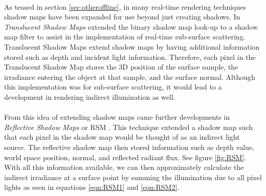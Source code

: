 \paragraph{}
As teased in section \ref{sec:otheroffline}, in many real-time rendering techniques shadow maps have been expanded for use beyond just creating shadows.  In \textit{Translucent Shadow Maps} \cite{Dachsbacher2003} extended the binary shadow map look-up to a shadow map filter to assist in the implementation of real-time sub-surface scattering.  Translucent Shadow Maps extend shadow maps by having additional information stored such as depth and incident light information.  Therefore, each pixel in the Translucent Shadow Map stores the 3D position of the surface sample, the irradiance entering the object at that sample, and the surface normal.  Although this implementation was for sub-surface scattering, it would lead to a development in rendering indirect illumination as well.

\paragraph{}
From this idea of extending shadow maps came further developments in \textit{Reflective Shadow Maps} or RSM \cite{Dachsbacher2005}.  This technique extended a shadow map such that each pixel in the shadow map would be thought of as an indirect light source.  The reflective shadow map then stored information such as depth value, world space position, normal, and reflected radiant flux.  See figure \ref{fig:RSM}.  With all this information available, we can then approximately calculate the indirect irradiance at a surface point by summing the illumination due to all pixel lights as seen in equations \ref{eqn:RSM1} and \ref{eqn:RSM2}.

